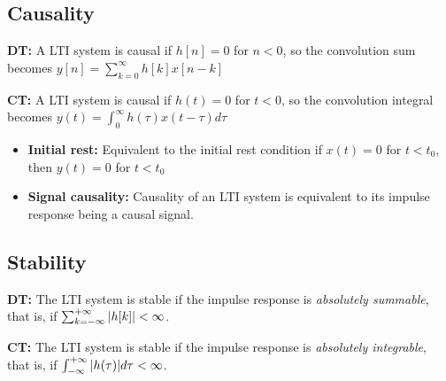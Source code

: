 \subsection{Causality}
\begin{definition}

    \textbf{DT:} A LTI system is causal if $h[n] = 0 $ for $n<0$, so the convolution sum becomes $y[n] = \sum_{k=0}^{\infty} h[k]x[n-k]$
    \vspace{1em}

    \textbf{CT:} A LTI system is causal if $h(t) = 0 $ for $t<0$, so the convolution integral becomes $y(t) = \int_{0}^{\infty} h(\tau) x(t-\tau) d\tau$

    \begin{itemize}
        \item \textbf{Initial rest:} Equivalent to the initial rest condition if $x(t) = 0$ for $t<t_0$, then $y(t)=0$ for $t<t_0$
        \item \textbf{Signal causality:} Causality of an LTI system is equivalent to its impulse response being a causal signal.
    \end{itemize}
\end{definition}

\subsection{Stability}
\begin{definition}
    
    \textbf{DT:} The LTI system is stable if the impulse response is \emph{absolutely summable}, that is, if $\sum_{k=-\infty}^{+\infty} \abs{h[k]} < \infty$.
    \vspace{1em}

    \textbf{CT:} The LTI system is stable if the impulse response is \emph{absolutely integrable}, that is, if $\int_{-\infty}^{+\infty} \abs{h(\tau)} d\tau < \infty$.
\end{definition}

